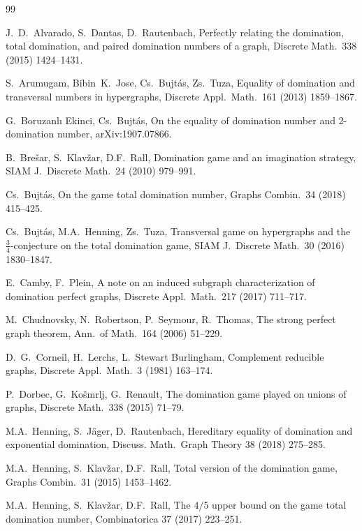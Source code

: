 \documentclass[12pt]{article}
\begin{document}
\begin{thebibliography}{99}

  J.~D.~Alvarado, S.~Dantas, D.~Rautenbach,
  Perfectly relating the domination, total domination, and paired domination numbers of a graph,
  Discrete Math.\ 338 (2015) 1424--1431.

  S.~Arumugam, Bibin~K.~Jose, Cs.~Bujt\' as, Zs.~Tuza,	
  Equality of domination and transversal numbers in hypergraphs,
  Discrete Appl.\ Math.\ 161 (2013) 1859--1867.
  
  G.~Boruzanl{\i} Ekinci, Cs.~Bujt\' as, 
  On the equality of domination number and 2-domination number, 
  arXiv:1907.07866.	

  B.~Bre{\v{s}}ar, S.~Klav\v{z}ar, D.F.~Rall,
  Domination game and an imagination strategy,
  SIAM J.\ Discrete Math.\ 24 (2010) 979--991.

  Cs.~Bujt\'as,
  On the game total domination number,
  Graphs Combin.\ 34 (2018) 415--425.
  
  Cs.~Bujt\'as, M.A.~Henning, Zs.~Tuza, 
  Transversal game on hypergraphs and the $\frac{3}{4}$-conjecture on the total domination game,
  SIAM J.\ Discrete Math.\ 30 (2016) 1830--1847.   
  
  E.~Camby, F.~Plein, 
  A note on an induced subgraph characterization of   domination perfect graphs,
   Discrete Appl.\ Math.\ 217 (2017) 711--717.
  
  M.~Chudnovsky, N.~Robertson, P.~Seymour, R.~Thomas, 
  The strong perfect graph theorem,
  Ann.\ of Math.\ 164 (2006) 51--229.
    
  D.~G.~Corneil, H.~Lerchs, L.~Stewart Burlingham, 
  Complement reducible graphs,
  Discrete Appl.\ Math.\ 3 (1981) 163--174.  

  P.~Dorbec, G.~Ko\v smrlj, G.~Renault,
  The domination game played on unions of graphs,
  Discrete Math.\ 338 (2015) 71--79.

  M.A.~Henning, S.~J\" ager, D.~Rautenbach,
  Hereditary equality of domination and exponential domination, 
Discuss. Math.\ Graph Theory 38 (2018) 275--285.
    
  M.A.~Henning, S.~Klav\v{z}ar, D.F.~Rall,
  Total version of the domination game,
  Graphs Combin.\ 31 (2015) 1453--1462.

  M.A.~Henning, S.~Klav\v{z}ar, D.F.~Rall,
  The $4/5$ upper bound on the game total domination number,
  Combinatorica 37 (2017) 223--251.


\end{thebibliography}
\end{document}
